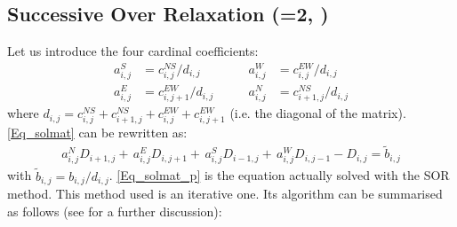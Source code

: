 \subsection{Successive Over Relaxation (=2, )}
\label{MISC_solsor}

Let us introduce the four cardinal coefficients: 
\begin{align*}
a_{i,j}^S &= c_{i,j    }^{NS}/d_{i,j}     &\qquad  a_{i,j}^W &= c_{i,j}^{EW}/d_{i,j}       \\
a_{i,j}^E &= c_{i,j+1}^{EW}/d_{i,j}    &\qquad   a_{i,j}^N &= c_{i+1,j}^{NS}/d_{i,j}   
\end{align*}
where $d_{i,j} = c_{i,j}^{NS}+ c_{i+1,j}^{NS} + c_{i,j}^{EW} + c_{i,j+1}^{EW}$ 
(i.e. the diagonal of the matrix). \eqref{Eq_solmat} can be rewritten as:
\begin{equation}  \label{Eq_solmat_p}
\begin{split}
a_{i,j}^{N}  D_{i+1,j} +\,a_{i,j}^{E}  D_{i,j+1} +\, a_{i,j}^{S}  D_{i-1,j} +\,a_{i,j}^{W} D_{i,j-1}  -  D_{i,j} = \tilde{b}_{i,j}
\end{split}
\end{equation}
with $\tilde b_{i,j} = b_{i,j}/d_{i,j}$. \eqref{Eq_solmat_p} is the equation actually solved 
with the SOR method. This method used is an iterative one. Its algorithm can be 
summarised as follows (see \citet{Haltiner1980} for a further discussion):

